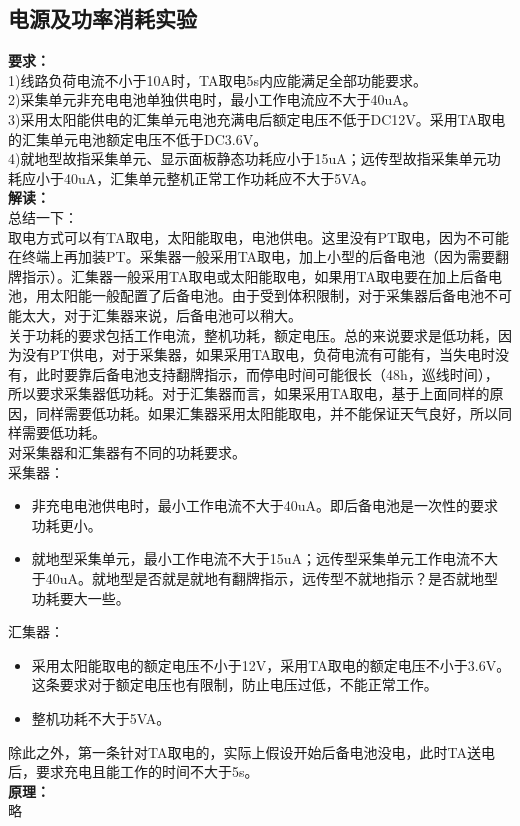 \documentclass{article}
\begin{document}
\begin{CJK}{UTF8}{gbsn}
\subsection{ 电源及功率消耗实验}
	\par
	\textbf{要求：}\\
	1)线路负荷电流不小于10A时，TA取电5s内应能满足全部功能要求。\\
	2)采集单元非充电电池单独供电时，最小工作电流应不大于40uA。\\
	3)采用太阳能供电的汇集单元电池充满电后额定电压不低于DC12V。采用TA取电的汇集单元电池额定电压不低于DC3.6V。\\
	4)就地型故指采集单元、显示面板静态功耗应小于15uA；远传型故指采集单元功耗应小于40uA，汇集单元整机正常工作功耗应不大于5VA。\\
	\textbf{解读：}\\
	总结一下：\\
	取电方式可以有TA取电，太阳能取电，电池供电。这里没有PT取电，因为不可能在终端上再加装PT。采集器一般采用TA取电，加上小型的后备电池（因为需要翻牌指示）。汇集器一般采用TA取电或太阳能取电，如果用TA取电要在加上后备电池，用太阳能一般配置了后备电池。由于受到体积限制，对于采集器后备电池不可能太大，对于汇集器来说，后备电池可以稍大。\\
	关于功耗的要求包括工作电流，整机功耗，额定电压。总的来说要求是低功耗，因为没有PT供电，对于采集器，如果采用TA取电，负荷电流有可能有，当失电时没有，此时要靠后备电池支持翻牌指示，而停电时间可能很长（48h，巡线时间），所以要求采集器低功耗。对于汇集器而言，如果采用TA取电，基于上面同样的原因，同样需要低功耗。如果汇集器采用太阳能取电，并不能保证天气良好，所以同样需要低功耗。\\
	对采集器和汇集器有不同的功耗要求。\\
	采集器：
	\begin{itemize}
			\item 非充电电池供电时，最小工作电流不大于40uA。即后备电池是一次性的要求功耗更小。
			\item 就地型采集单元，最小工作电流不大于15uA；远传型采集单元工作电流不大于40uA。就地型是否就是就地有翻牌指示，远传型不就地指示？是否就地型功耗要大一些。
	\end{itemize}
	汇集器：
	\begin{itemize}
			\item 采用太阳能取电的额定电压不小于12V，采用TA取电的额定电压不小于3.6V。这条要求对于额定电压也有限制，防止电压过低，不能正常工作。
			\item 整机功耗不大于5VA。
	\end{itemize}
	除此之外，第一条针对TA取电的，实际上假设开始后备电池没电，此时TA送电后，要求充电且能工作的时间不大于5s。\\
	\textbf{原理：}\\
	略

\end{CJK}
\end{document}
